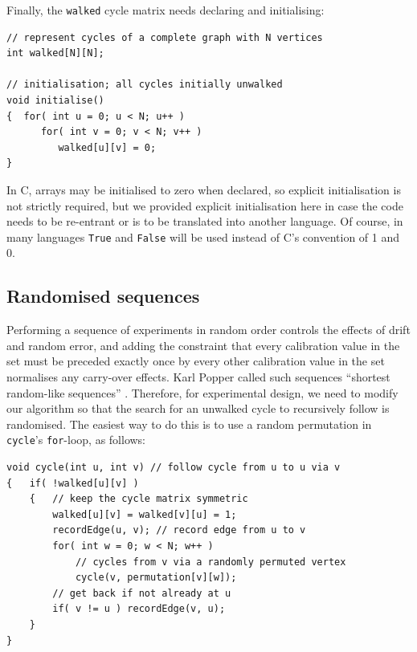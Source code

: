 \documentclass[preprint,times]{elsarticle}
\begin{document}
Finally, the \texttt{walked} cycle matrix needs declaring and initialising: 

\begin{Verbatim}
// represent cycles of a complete graph with N vertices
int walked[N][N]; 

// initialisation; all cycles initially unwalked
void initialise() 
{  for( int u = 0; u < N; u++ )
      for( int v = 0; v < N; v++ )
         walked[u][v] = 0; 
}
\end{Verbatim}

In C, arrays may be initialised to zero when declared, so explicit initialisation is not strictly required, but we provided explicit initialisation here in case the code needs to be re-entrant or is to be translated into another language. Of course, in many languages \texttt{True} and \texttt{False} will be used instead of C's convention of 1 and 0.

\subsection{Randomised sequences}\label{randomise}

Performing a sequence of experiments in random order controls the effects of drift and random error, and adding the constraint that every calibration value in the set must be preceded exactly once by every other calibration value in the set normalises any carry-over effects. Karl Popper called such sequences ``shortest random-like sequences'' \cite{popper}. Therefore, for experimental design, we need to modify our algorithm so that the search for an unwalked cycle to recursively follow is randomised. The easiest way to do this is to use a random permutation in \texttt{cycle}'s \texttt{for}-loop, as follows:

\begin{Verbatim}
void cycle(int u, int v) // follow cycle from u to u via v
{   if( !walked[u][v] )
    {   // keep the cycle matrix symmetric
        walked[u][v] = walked[v][u] = 1; 
        recordEdge(u, v); // record edge from u to v
        for( int w = 0; w < N; w++ ) 
            // cycles from v via a randomly permuted vertex
            cycle(v, permutation[v][w]); 
        // get back if not already at u
        if( v != u ) recordEdge(v, u); 
    }
}
\end{Verbatim}
\end{document}
